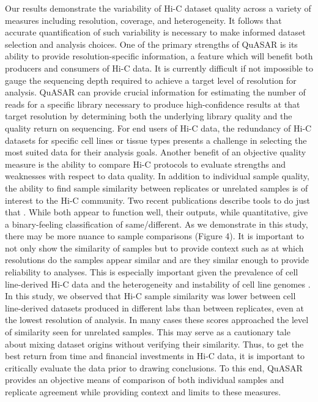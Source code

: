 Our results demonstrate the variability of Hi-C dataset quality across a variety of measures including resolution, coverage, and heterogeneity. It follows that accurate quantification of such variability is necessary to make informed dataset selection and analysis choices. One of the primary strengths of QuASAR is its ability to provide resolution-specific information, a feature which will benefit both producers and consumers of Hi-C data. It is currently difficult if not impossible to gauge the sequencing depth required to achieve a target level of resolution for analysis. QuASAR can provide crucial information for estimating the number of reads for a specific library necessary to produce high-confidence results at that target resolution by determining both the underlying library quality and the quality return on sequencing. For end users of Hi-C data, the redundancy of Hi-C datasets for specific cell lines or tissue types presents a challenge in selecting the most suited data for their analysis goals. Another benefit of an objective quality measure is the ability to compare Hi-C protocols to evaluate strengths and weaknesses with respect to data quality. In addition to individual sample quality, the ability to find sample similarity between replicates or unrelated samples is of interest to the Hi-C community. Two recent publications describe tools to do just that \cite{yang_hicrep:_2017,yan_hic-spector:_2017}. While both appear to function well, their outputs, while quantitative, give a binary-feeling classification of same/different. As we demonstrate in this study, there may be more nuance to sample comparisons (Figure 4). It is important to not only show the similarity of samples but to provide context such as at which resolutions do the samples appear similar and are they similar enough to provide reliability to analyses. This is especially important given the prevalence of cell line-derived Hi-C data and the heterogeneity and instability of cell line genomes \cite{khan_heterogeneous_2017,jemaa_heterogeneity_2017}. In this study, we observed that Hi-C sample similarity was lower between cell line-derived datasets produced in different labs than between replicates, even at the lowest resolution of analysis. In many cases these scores approached the level of similarity seen for unrelated samples. This may serve as a cautionary tale about mixing dataset origins without verifying their similarity. Thus, to get the best return from time and financial investments in Hi-C data, it is important to critically evaluate the data prior to drawing conclusions. To this end, QuASAR provides an objective means of comparison of both individual samples and replicate agreement while providing context and limits to these measures.

